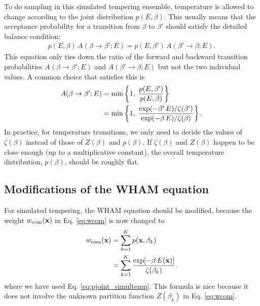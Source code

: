 \documentclass[aip,jcp,preprint,superscriptaddress]{revtex4-1}
\begin{document}
To do sampling in this simulated tempering ensemble,
temperature is allowed to change
according to the joint distribution $p(E, \beta)$.
%
This usually means that
the acceptance probability for a transition
from $\beta$ to $\beta'$
should satisfy the detailed balance condition:
%
\begin{align*}
  p(E, \beta) \, A(\beta \rightarrow \beta'; E)
  =
  p(E, \beta') \, A(\beta' \rightarrow \beta; E).
\end{align*}
%
This equation only ties down
the ratio of the forward and backward
transition probabilities
$A(\beta \rightarrow \beta'; E)$ and $A(\beta' \rightarrow \beta; E)$
but not the two individual values.
%
A common choice that satisfies this is
%
\begin{align}
  A(\beta \rightarrow \beta'; E)
  &=
  \min\left\{
    1, \;
    \frac{
      p(E, \beta')
    }
    {
      p(E, \beta)
    }
  \right\}
  \notag \\
  &=
  \min\left\{
    1, \;
    \frac{
      \exp(-\beta' \, E) / \zeta(\beta')
    }
    {
      \exp(-\beta \, E) / \zeta(\beta)
    }
  \right\}.
\end{align}
%
In practice,
for temperature transitions,
we only need to decide
the values of $\zeta(\beta)$
instead of those of $Z(\beta)$ and $p(\beta)$.
%
If $\zeta(\beta)$ and $Z(\beta)$
happen to be close enough (up to a multiplicative constant),
the overall temperature distribution, $p(\beta)$,
should be roughly flat.




\subsection{Modifications of the WHAM equation}



For simulated tempering,
the WHAM equation should be modified,
because the weight $w_{\mathrm{com}}(\mathbf{x})$
in Eq. \eqref{eq:wcom}
is now changed to
%
\begin{align}
  w_{\mathrm{com}}(\mathbf{x})
  &=
  \sum_{k = 1}^K p(\mathbf{x}, \beta_k)
  \notag \\
  &=
  \sum_{k = 1}^K
  \frac{ \exp[-\beta \, E(\mathbf{x}) ] }
       { \zeta(\beta_k) }.
  \label{eq:wcom_simultemp}
\end{align}
%
where we have used
Eq. \eqref{eq:pjoint_simultemp}.
%
This formula is nice because
it does not involve
the unknown partition function $Z(\beta_k)$
in Eq. \eqref{eq:wcom}.
\end{document}
